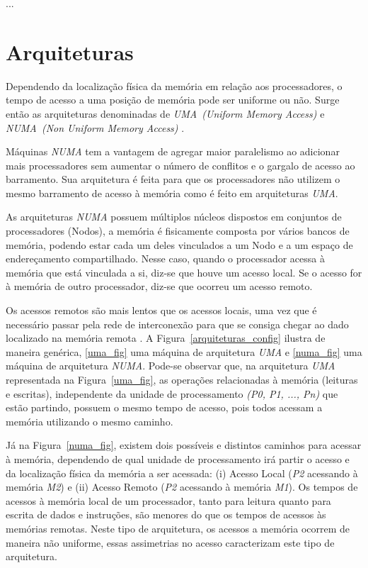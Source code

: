 \documentclass[diss,capa]{texufpel}
\begin{document}
...

\chapter{Arquiteturas}
\label{chapter::arquiteturas}

Dependendo da localização física da memória em relação aos processadores, o tempo de acesso a uma posição de memória pode ser uniforme ou não. Surge então as arquiteturas denominadas de \emph{UMA~(Uniform Memory Access)} e \emph{NUMA~(Non Uniform Memory Access)} \cite{carissimi_2007}.

Máquinas \emph{NUMA} tem a vantagem de agregar maior paralelismo ao adicionar mais processadores sem aumentar o número de conflitos e o gargalo de acesso ao barramento. Sua arquitetura é feita para que os processadores não utilizem o mesmo barramento de acesso à memória como é feito em arquiteturas \emph{UMA}. %

As arquiteturas \emph{NUMA} possuem múltiplos núcleos dispostos em conjuntos de processadores (Nodos), a memória é fisicamente composta por vários bancos de memória, podendo estar cada um deles vinculados a um Nodo e a um espaço de endereçamento compartilhado. Nesse caso, quando o processador acessa à memória que está vinculada a si, diz-se que houve um acesso local. Se o acesso for à memória de outro processador, diz-se que ocorreu um acesso remoto.

Os acessos remotos são mais lentos que os acessos locais, uma vez que é necessário passar pela rede de interconexão para que se consiga chegar ao dado localizado na memória remota \cite{Rodolfo:2014}. A Figura~\ref{arquiteturas_config} ilustra de maneira genérica, \ref{uma_fig} uma máquina de arquitetura \emph{UMA} e \ref{numa_fig} uma máquina de arquitetura \emph{NUMA}. Pode-se observar que, na arquitetura \emph{UMA} representada na Figura~\ref{uma_fig}, as operações relacionadas à memória (leituras e escritas), independente da unidade de processamento \emph{(P0, P1, ..., Pn)} que estão partindo, possuem o mesmo tempo de acesso, pois todos acessam a memória utilizando o mesmo caminho.

Já na Figura~\ref{numa_fig}, existem dois possíveis e distintos caminhos para acessar à memória, dependendo de qual unidade de processamento irá partir o acesso e da localização física da memória a ser acessada: (i) Acesso Local (\emph{P2} acessando à memória \emph{M2}) e (ii) Acesso Remoto (\emph{P2} acessando à memória \emph{M1}). Os tempos de acessos à memória local de um processador, tanto para leitura quanto para escrita de dados e instruções, são menores do que os tempos de acessos às memórias remotas. Neste tipo de arquitetura, os acessos a memória ocorrem de maneira não uniforme, essas assimetrias no acesso caracterizam este tipo de arquitetura.
\end{document}
